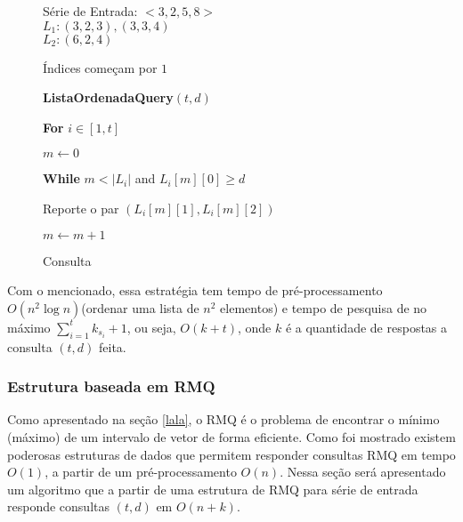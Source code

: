 \documentclass[12pt]{article}
\begin{document}
\begin{center}
\begin{figure}
\begin{framed}
Série de Entrada: $<3, 2, 5, 8>$ \\
$L_1: (3, 2, 3), (3, 3, 4)$ \\
$L_2: (6, 2, 4)$ \\
\end{framed}
\label{fig:exemplolista}
\caption{Índices começam por $1$}
\end{figure}
\end{center}



\begin{center}
\begin{figure}
\begin{framed}

{\bf ListaOrdenadaQuery}$(t, d)$

\hspace{1cm} {\bf For} $i \in [1, t]$

\hspace{2cm} $m \leftarrow 0$

\hspace{2cm} {\bf While} $m < |L_i|$ and $L_i[m][0] \ge d$

\hspace{3cm} Reporte o par $(L_i[m][1], L_i[m][2])$

\hspace{3cm} $m \leftarrow m + 1$
\end{framed}
\label{fig:listaquery}
\caption{Consulta}
\end{figure}
\end{center}

Com o mencionado, essa estratégia tem tempo de pré-processamento $O(n^2 \log n)$(ordenar uma lista de $n^2$ elementos) 
e tempo de pesquisa de no máximo $\sum_{i = 1}^{t} k_{s_i} + 1$, ou seja, $O(k + t)$,
onde $k$ é a quantidade de respostas a consulta $(t,d)$ feita.

\subsubsection{Estrutura baseada em RMQ}

Como apresentado na seção \ref{lala}, o RMQ é o problema de 
encontrar o mínimo (máximo) de um intervalo de vetor de forma 
eficiente. Como foi mostrado existem poderosas estruturas
de dados que permitem responder consultas RMQ em tempo $O(1)$, a partir de um pré-processamento $O(n)$. 
Nessa seção será apresentado um algoritmo que a partir de uma estrutura de RMQ para série
de entrada responde consultas $(t, d)$ em $O(n + k)$. 
\end{document}
